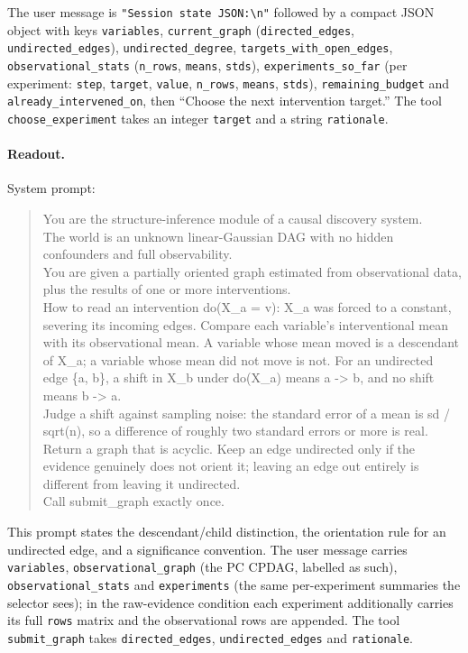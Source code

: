 \documentclass{article}
\begin{document}
\noindent The user message is \texttt{"Session state JSON:\textbackslash n"} followed by a
compact JSON object with keys \texttt{variables}, \texttt{current\_graph}
(\texttt{directed\_edges}, \texttt{undirected\_edges}), \texttt{undirected\_degree},
\texttt{targets\_with\_open\_edges}, \texttt{observational\_stats} (\texttt{n\_rows},
\texttt{means}, \texttt{stds}), \texttt{experiments\_so\_far} (per experiment: \texttt{step},
\texttt{target}, \texttt{value}, \texttt{n\_rows}, \texttt{means}, \texttt{stds}),
\texttt{remaining\_budget} and \texttt{already\_intervened\_on}, then ``Choose the next
intervention target.'' The tool \texttt{choose\_experiment} takes an integer \texttt{target}
and a string \texttt{rationale}.

\paragraph{Readout.} System prompt:

\begin{quote}\small\ttfamily\raggedright
You are the structure-inference module of a causal discovery system.\\
The world is an unknown linear-Gaussian DAG with no hidden confounders and full
observability.\\
You are given a partially oriented graph estimated from observational data, plus the results
of one or more interventions.\\
How to read an intervention do(X\_a = v): X\_a was forced to a constant, severing its incoming
edges. Compare each variable's interventional mean with its observational mean. A variable
whose mean moved is a descendant of X\_a; a variable whose mean did not move is not. For an
undirected edge \{a, b\}, a shift in X\_b under do(X\_a) means a -> b, and no shift means
b -> a.\\
Judge a shift against sampling noise: the standard error of a mean is sd / sqrt(n), so a
difference of roughly two standard errors or more is real.\\
Return a graph that is acyclic. Keep an edge undirected only if the evidence genuinely does
not orient it; leaving an edge out entirely is different from leaving it undirected.\\
Call submit\_graph exactly once.
\end{quote}

\noindent This prompt states the descendant/child distinction, the orientation rule for an
undirected edge, and a significance convention. The user message carries \texttt{variables},
\texttt{observational\_graph} (the PC CPDAG, labelled as such), \texttt{observational\_stats}
and \texttt{experiments} (the same per-experiment summaries the selector sees); in the
raw-evidence condition each experiment additionally carries its full \texttt{rows} matrix and
the observational rows are appended. The tool \texttt{submit\_graph} takes
\texttt{directed\_edges}, \texttt{undirected\_edges} and \texttt{rationale}.
\end{document}
